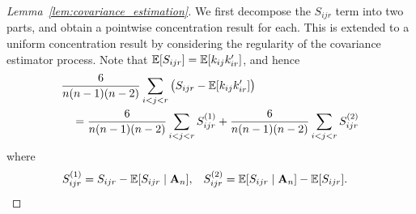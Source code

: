 \begin{proof}[Lemma~\ref{lem:covariance_estimation}]

  We first decompose the $S_{i j r}$ term into two parts,
  and obtain a pointwise concentration result for each.
  This is extended to a uniform concentration result
  by considering the regularity of the covariance estimator process.
  Note that
  $\mathbb{E}[S_{i j r}] = \mathbb{E}[k_{i j} k_{i r}']$,
  and hence
  \begin{align*}
    &\frac{6}{n(n-1)(n-2)}
    \sum_{i<j<r}
    \big(
      S_{i j r}
      - \mathbb{E}[k_{i j} k_{i r}']
    \big) \\
    &\quad=
    \frac{6}{n(n-1)(n-2)}
    \sum_{i<j<r}
    S_{i j r}^{(1)}
    + \frac{6}{n(n-1)(n-2)}
    \sum_{i<j<r}
    S_{i j r}^{(2)}
  \end{align*}
  where
  \begin{align*}
    S_{i j r}^{(1)}
    &=
    S_{i j r} -
    \mathbb{E}[S_{i j r} \mid \mathbf{A}_n],
    &S_{i j r}^{(2)}
    &=
    \mathbb{E}[S_{i j r} \mid \mathbf{A}_n]
    - \mathbb{E}[S_{i j r}].
  \end{align*}



\end{proof}
